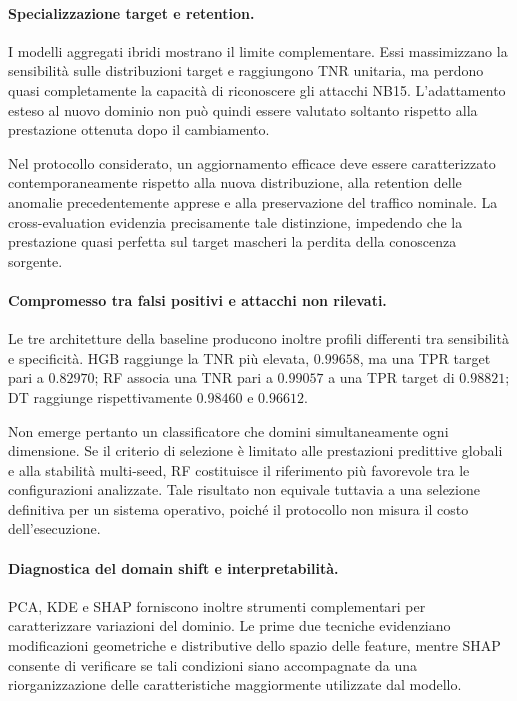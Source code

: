 \paragraph{Specializzazione target e retention.}
I modelli aggregati ibridi mostrano il limite complementare. 
Essi massimizzano la sensibilità sulle distribuzioni target e raggiungono TNR unitaria, ma perdono quasi completamente la capacità di riconoscere gli attacchi NB15. 
L'adattamento esteso al nuovo dominio non può quindi essere valutato soltanto rispetto alla prestazione ottenuta dopo il cambiamento.

Nel protocollo considerato, un aggiornamento efficace deve essere caratterizzato contemporaneamente rispetto alla nuova distribuzione, alla retention delle anomalie precedentemente apprese e alla preservazione del traffico nominale. 
La cross-evaluation evidenzia precisamente tale distinzione, impedendo che la prestazione quasi perfetta sul target mascheri la perdita della conoscenza sorgente.

\paragraph{Compromesso tra falsi positivi e attacchi non rilevati.}
Le tre architetture della baseline producono inoltre profili differenti tra sensibilità e specificità. 
HGB raggiunge la TNR più elevata, $0.99658$, ma una TPR target pari a $0.82970$; RF associa una TNR pari a $0.99057$ a una TPR target di $0.98821$; DT raggiunge rispettivamente $0.98460$ e $0.96612$.

Non emerge pertanto un classificatore che domini simultaneamente ogni dimensione. 
Se il criterio di selezione è limitato alle prestazioni predittive globali e alla stabilità multi-seed, RF costituisce il riferimento più favorevole tra le configurazioni analizzate. 
Tale risultato non equivale tuttavia a una selezione definitiva per un sistema operativo, poiché il protocollo non misura il costo dell'esecuzione.

\paragraph{Diagnostica del domain shift e interpretabilità.}
PCA, KDE e SHAP forniscono inoltre strumenti complementari per caratterizzare variazioni del dominio. 
Le prime due tecniche evidenziano modificazioni geometriche e distributive dello spazio delle feature, mentre SHAP consente di verificare se tali condizioni siano accompagnate da una riorganizzazione delle caratteristiche maggiormente utilizzate dal modello.

